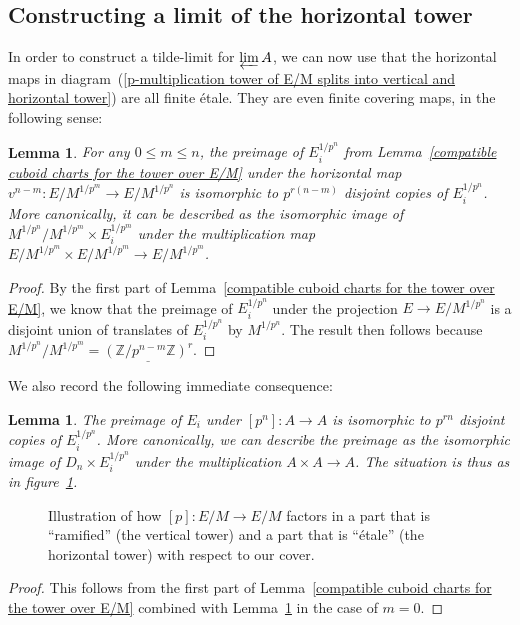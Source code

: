 \documentclass[10pt,oneside]{amsart}
\newtheorem{lemma}[theorem]{Lemma}
\theoremstyle{definition}
\begin{document}
	\subsection{Constructing a limit of the horizontal tower}
	In order to construct a tilde-limit for $\varprojlim A$, we can now use that the horizontal maps in diagram~(\ref{p-multiplication tower of E/M splits into vertical and horizontal tower}) are all finite \'etale. They are even finite covering maps, in the following sense:
	\begin{lemma}\label{horizontal map is covering map}
		For any $0\leq m\leq n$, the preimage of $E_i^{1/p^n}$ from Lemma~\ref{compatible cuboid charts for the tower over E/M} under the horizontal map $v^{n-m}:E/M^{1/p^{m}}\rightarrow E/M^{1/p^n}$ is isomorphic to $p^{r(n-m)}$ disjoint copies of $E_i^{1/p^n}$. More canonically, it can be described as the isomorphic image of $M^{1/p^n}/M^{1/p^m}\times E_i^{1/p^m}$ under the multiplication map $E/M^{1/p^m}\times E/M^{1/p^m}\rightarrow E/M^{1/p^m}$.
	\end{lemma}
	\begin{proof}
		By the first part of Lemma~\ref{compatible cuboid charts for the tower over E/M}, we know that the preimage of $E_i^{1/p^n}$ under the projection $E\rightarrow E/M^{1/p^n}$ is a disjoint union of translates of $E_i^{1/p^n}$ by $M^{1/p^{n}}$. The result then follows because $M^{1/p^{n}}/M^{1/p^{m}} =  \underline{(\mathbb Z/p^{n-m}\mathbb Z)^r}$.
	\end{proof}
	We also record the following immediate consequence:
	
	\begin{lemma}\label{preimage of E_i under p^n is disjoint copies}
		The preimage of $E_i$ under $[p^n]:A\rightarrow A$ is isomorphic to $p^{rn}$ disjoint copies of $E_i^{1/p^n}$. More canonically, we can describe the preimage as the isomorphic image of  $D_n \times E_i^{1/p^n}$ under the multiplication $A\times A\rightarrow A$. The situation is thus as in figure~\ref{local-glueing-[p]-tikzpicture}.
	\end{lemma}
	\begin{figure}
		
		\caption{Illustration of how $[p]:E/M\rightarrow E/M$ factors in a part that is ``ramified'' (the vertical tower) and a part that is ``\'etale'' (the horizontal tower) with respect to our cover.}
		\label{local-glueing-[p]-tikzpicture}
	\end{figure}
	\begin{proof}
		This follows from the first part of Lemma~\ref{compatible cuboid charts for the tower over E/M} combined with Lemma~\ref{horizontal map is covering map} in the case of $m=0$.
	\end{proof}
	
\end{document}
